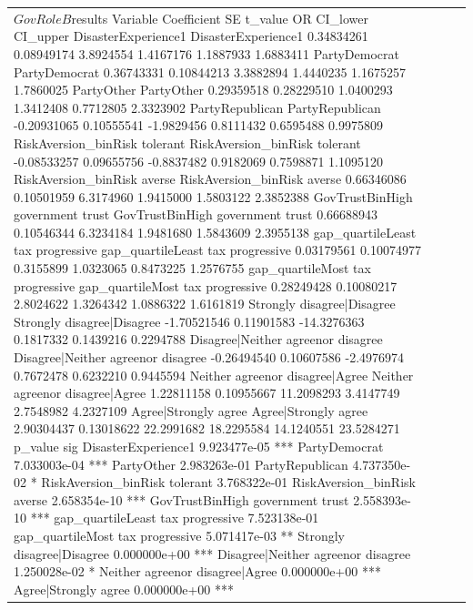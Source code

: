 \begin{table}[!h]
\begin{tabular}[t]{>{\raggedright\arraybackslash}p{6.4cm}ccc}
$GovRoleB$results
                                                             Variable Coefficient         SE     t_value         OR   CI_lower   CI_upper
DisasterExperience1                               DisasterExperience1  0.34834261 0.08949174   3.8924554  1.4167176  1.1887933  1.6883411
PartyDemocrat                                           PartyDemocrat  0.36743331 0.10844213   3.3882894  1.4440235  1.1675257  1.7860025
PartyOther                                                 PartyOther  0.29359518 0.28229510   1.0400293  1.3412408  0.7712805  2.3323902
PartyRepublican                                       PartyRepublican -0.20931065 0.10555541  -1.9829456  0.8111432  0.6595488  0.9975809
RiskAversion_binRisk tolerant           RiskAversion_binRisk tolerant -0.08533257 0.09655756  -0.8837482  0.9182069  0.7598871  1.1095120
RiskAversion_binRisk averse               RiskAversion_binRisk averse  0.66346086 0.10501959   6.3174960  1.9415000  1.5803122  2.3852388
GovTrustBinHigh government trust     GovTrustBinHigh government trust  0.66688943 0.10546344   6.3234184  1.9481680  1.5843609  2.3955138
gap_quartileLeast tax progressive   gap_quartileLeast tax progressive  0.03179561 0.10074977   0.3155899  1.0323065  0.8473225  1.2576755
gap_quartileMost tax progressive     gap_quartileMost tax progressive  0.28249428 0.10080217   2.8024622  1.3264342  1.0886322  1.6161819
Strongly disagree|Disagree                 Strongly disagree|Disagree -1.70521546 0.11901583 -14.3276363  0.1817332  0.1439216  0.2294788
Disagree|Neither agreenor disagree Disagree|Neither agreenor disagree -0.26494540 0.10607586  -2.4976974  0.7672478  0.6232210  0.9445594
Neither agreenor disagree|Agree       Neither agreenor disagree|Agree  1.22811158 0.10955667  11.2098293  3.4147749  2.7548982  4.2327109
Agree|Strongly agree                             Agree|Strongly agree  2.90304437 0.13018622  22.2991682 18.2295584 14.1240551 23.5284271
                                        p_value sig
DisasterExperience1                9.923477e-05 ***
PartyDemocrat                      7.033003e-04 ***
PartyOther                         2.983263e-01    
PartyRepublican                    4.737350e-02   *
RiskAversion_binRisk tolerant      3.768322e-01    
RiskAversion_binRisk averse        2.658354e-10 ***
GovTrustBinHigh government trust   2.558393e-10 ***
gap_quartileLeast tax progressive  7.523138e-01    
gap_quartileMost tax progressive   5.071417e-03  **
Strongly disagree|Disagree         0.000000e+00 ***
Disagree|Neither agreenor disagree 1.250028e-02   *
Neither agreenor disagree|Agree    0.000000e+00 ***
Agree|Strongly agree               0.000000e+00 ***



\end{tabular}
\end{table}
